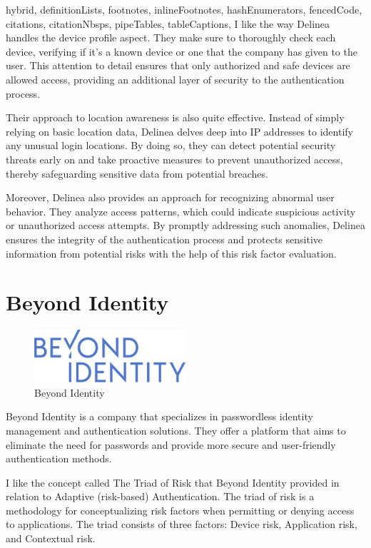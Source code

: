 \documentclass[
  digital,     %
  oneside,     %
  nosansbold,  %
  nocolorbold, %
  lof,         %
  lot,         %
]{fithesis4}
\begin{document}
\begin{markdown*}{%
  hybrid,
  definitionLists,
  footnotes,
  inlineFootnotes,
  hashEnumerators,
  fencedCode,
  citations,
  citationNbsps,
  pipeTables,
  tableCaptions,
}
I like the way Delinea handles the device profile aspect.
They make sure to thoroughly check each device, verifying if it's a known device or one that the company has given to the user. This attention to detail ensures that only authorized and safe devices are allowed access, providing an additional layer of security to the authentication process.

Their approach to location awareness is also quite effective.
Instead of simply relying on basic location data, Delinea delves deep into IP addresses to identify any unusual login locations. By doing so, they can detect potential security threats early on and take proactive measures to prevent unauthorized access, thereby safeguarding sensitive data from potential breaches.

Moreover, Delinea also provides an approach for recognizing abnormal user behavior.
They analyze access patterns, which could indicate suspicious activity or unauthorized access attempts.
By promptly addressing such anomalies, Delinea ensures the integrity of the authentication process and protects sensitive information from potential risks with the help of this risk factor evaluation.


\section{Beyond Identity}

\begin{figure}[htbp]
  \centering
  \includegraphics[width=0.5\textwidth]{img/BeyondIdentity-logo.png}
  \caption{Beyond Identity}
  \label{fig:beyond-identity-logo}
\end{figure}

Beyond Identity is a company that specializes in passwordless identity management and authentication solutions. They offer a platform that aims to eliminate the need for passwords and provide more secure and user-friendly authentication methods.

I like the concept called The Triad of Risk that Beyond Identity provided in relation to Adaptive (risk-based) Authentication.
The triad of risk is a methodology for conceptualizing risk factors when permitting or denying access to applications.
The triad consists of three factors: Device risk, Application risk, and Contextual risk.


\end{markdown*}
\end{document}
